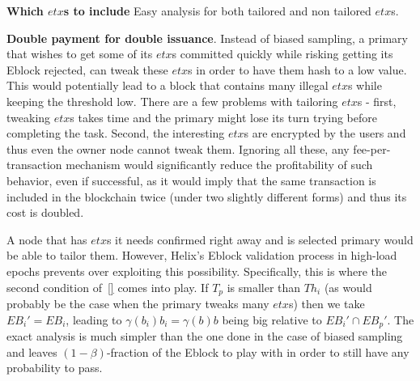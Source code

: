 


\textbf{Which $etx$s to include} Easy analysis for both tailored and non tailored $etx$s.


\textbf{Double payment for double issuance}. Instead of biased sampling, a primary that wishes to get some of its $etx$s committed quickly while risking getting its Eblock rejected, can tweak these $etx$s in order to have them hash to a low value. This would potentially lead to a block that contains many illegal $etx$s while keeping the threshold low. There are a few problems with tailoring $etx$s - first, tweaking $etx$s takes time and the primary might lose its turn trying before completing the task. Second, the interesting $etx$s are encrypted by the users and thus even the owner node cannot tweak them. Ignoring all these, any fee-per-transaction mechanism would significantly reduce the profitability of such behavior, even if successful, as it would imply that the same transaction is included in the blockchain twice (under two slightly different forms) and thus its cost is doubled.

A node that has $etx$s it needs confirmed right away and is selected primary would be able to tailor them. However, Helix's Eblock validation process in high-load epochs prevents over exploiting this possibility. Specifically, this is where the second condition of~\ref{} comes into play. If $T_p$ is smaller than $Th_i$ (as would probably be the case when the primary tweaks many $etx$s) then we take $EB_i'=EB_i$, leading to $\gamma(b_i)b_i=\gamma(b)b$ being big relative to $EB_i'\cap EB_p'$. The exact analysis is much simpler than the one done in the case of biased sampling and leaves $(1-\beta)$-fraction of the Eblock to play with in order to still have any probability to pass.      



